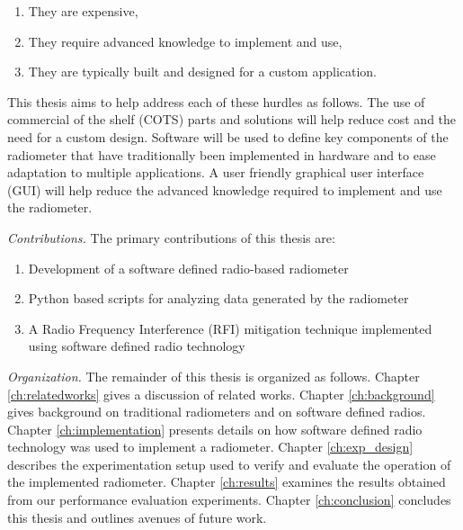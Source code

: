 \begin{enumerate}
\item They are expensive,
\item They require advanced knowledge to implement and use,
\item They are typically built and designed for a custom application.
\end{enumerate}

This thesis aims to help address each of these hurdles as follows.  The use of commercial of the shelf (COTS) parts and solutions will help reduce cost and the need for a custom design.  Software will be used to define key components of the radiometer that have traditionally been implemented in hardware and to ease adaptation to multiple applications.  A user friendly graphical user interface (GUI) will help reduce the advanced knowledge required to implement and use the radiometer. 

\emph{Contributions.}  The primary contributions of this thesis are:

\begin{enumerate}
\item Development of a software defined radio-based radiometer
\item Python based scripts for analyzing data generated by the radiometer
\item A Radio Frequency Interference (RFI) mitigation technique implemented using software defined radio technology
\end{enumerate}

\emph{Organization.}  The remainder of this thesis is organized as follows.  Chapter \ref{ch:relatedworks} gives a discussion of related works.  Chapter \ref{ch:background} gives background on traditional radiometers and on software defined radios.  Chapter \ref{ch:implementation} presents details on how software defined radio technology was used to implement a radiometer.  Chapter \ref{ch:exp_design} describes the experimentation setup used to verify and evaluate the operation of the implemented radiometer.  Chapter \ref{ch:results} examines the results obtained from our performance evaluation experiments.  Chapter \ref{ch:conclusion} concludes this thesis and outlines avenues of future work.

